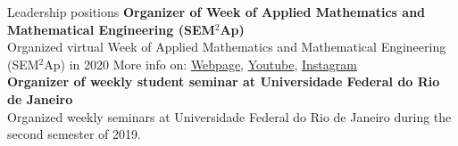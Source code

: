 \documentclass[12pt]{resume} %
\begin{document}
\begin{rSection}{Leadership positions}
{\bf Organizer of Week of Applied Mathematics and Mathematical Engineering (SEM$^2$Ap)}
\\
Organized virtual Week of Applied Mathematics and Mathematical Engineering (SEM$^2$Ap) in 2020
{\scriptsize More info on:  \href{http://semap.rio.br/2020/en/}{Webpage},   \href{https://www.youtube.com/channel/UC14NMQ5cOsSuLrAQGGa2T4Q}{Youtube}, 
\href{https://www.instagram.com/semap.rio/}{Instagram}}
\\
{\bf Organizer of weekly student seminar at Universidade Federal do Rio de Janeiro}
\\
Organized weekly seminars at Universidade Federal do Rio de Janeiro during the second semester of 2019.
\end{rSection}



\end{document}
